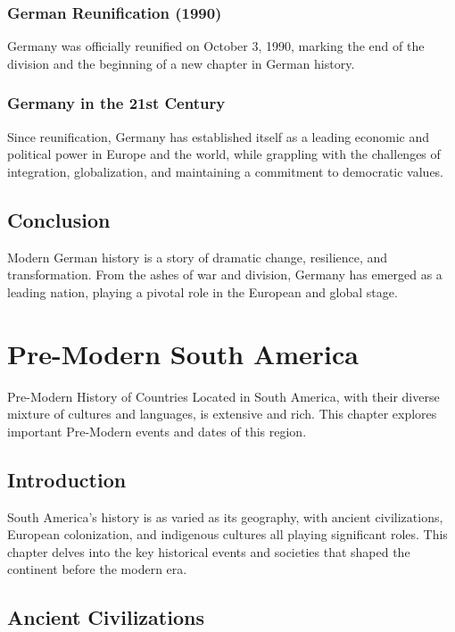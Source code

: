 \documentclass[a4paper,12pt]{book}
\begin{document}
\subsection{German Reunification (1990)}
Germany was officially reunified on October 3, 1990, marking the end of the division and the beginning of a new chapter in German history.

\subsection{Germany in the 21st Century}
Since reunification, Germany has established itself as a leading economic and political power in Europe and the world, while grappling with the challenges of integration, globalization, and maintaining a commitment to democratic values.

\section{Conclusion}
\label{sec:conclusion-modern-germany}
Modern German history is a story of dramatic change, resilience, and transformation. From the ashes of war and division, Germany has emerged as a leading nation, playing a pivotal role in the European and global stage.

\chapter{Pre-Modern South America}
\label{ch:pre-modern-history-south-america}

Pre-Modern History of Countries Located in South America, with their diverse mixture of cultures and languages, is extensive and rich. This chapter explores important Pre-Modern events and dates of this region.

\section{Introduction}
\label{sec:introduction-pre-modern-south-america}
South America’s history is as varied as its geography, with ancient civilizations, European colonization, and indigenous cultures all playing significant roles. This chapter delves into the key historical events and societies that shaped the continent before the modern era.

\section{Ancient Civilizations}
\label{sec:ancient-civilizations-south-america}
\end{document}
